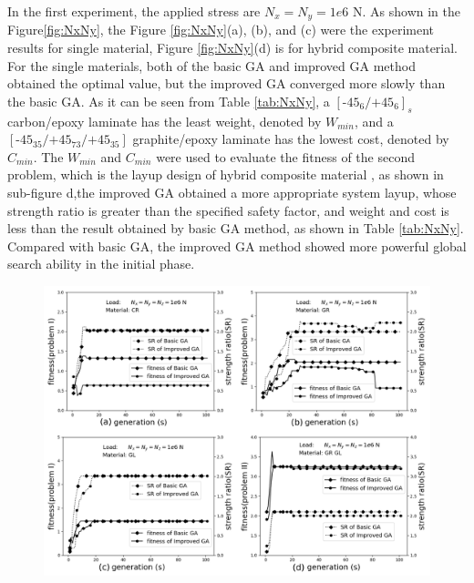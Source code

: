 \documentclass[USenglish]{article}
\begin{document}
  In the first experiment, the applied stress are $N_x=N_y=1e6$ N.  As shown in the
Figure\ref{fig:NxNy}, the Figure \ref{fig:NxNy}(a), (b), and (c) were the experiment results for single material,
Figure \ref{fig:NxNy}(d) is for hybrid composite material. For the single materials, both of the basic GA and improved
GA method obtained the optimal value, but the improved GA converged more slowly than the basic GA.
As it can be seen from Table \ref{tab:NxNy}, a $[\text{-}45_{6}/\text{+}45_{6}]_s$ carbon/epoxy
laminate has the least weight, denoted by $W_{min}$, and a
$[\text{-}45_{35}/\text{+}45_{73}/\text{+}45_{35}]$ graphite/epoxy laminate has the lowest cost,
denoted by $C_{min}$. The $W_{min}$ and $C_{min}$ were used to evaluate the fitness of the second
problem, which is the layup design of hybrid composite material , as shown in sub-figure d,the
improved GA obtained a more appropriate system layup, whose strength ratio is greater than the
specified safety factor, and weight and cost is less than the result obtained by basic GA method, as
shown in Table \ref{tab:NxNy}. Compared with basic GA, the improved GA method showed more powerful
global search ability in the initial phase.

\begin{figure}
  \includegraphics[width=\linewidth]{A_laminate_design_images/NxNyNz.png}
  \label{fig:NxNyNz}
\end{figure}
\end{document}
